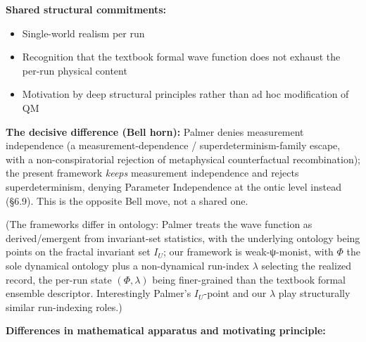 \documentclass[11pt,a4paper]{article}
\begin{document}
\textbf{Shared structural commitments:}
\begin{itemize}
  \item Single-world realism per run
  \item Recognition that the textbook formal wave function does not exhaust the per-run physical content
  \item Motivation by deep structural principles rather than ad hoc modification of QM
\end{itemize}

\textbf{The decisive difference (Bell horn):} Palmer denies measurement independence (a measurement-dependence / superdeterminism-family escape, with a non-conspiratorial rejection of metaphysical counterfactual recombination); the present framework \emph{keeps} measurement independence and rejects superdeterminism, denying Parameter Independence at the ontic level instead (§6.9). This is the opposite Bell move, not a shared one.

(The frameworks differ in ontology: Palmer treats the wave function as derived/emergent from invariant-set statistics, with the underlying ontology being points on the fractal invariant set $I_U$; our framework is weak-ψ-monist, with $\Phi$ the sole dynamical ontology plus a non-dynamical run-index $\lambda$ selecting the realized record, the per-run state $(\Phi,\lambda)$ being finer-grained than the textbook formal ensemble descriptor. Interestingly Palmer's $I_U$-point and our $\lambda$ play structurally similar run-indexing roles.)

\textbf{Differences in mathematical apparatus and motivating principle:}
\end{document}
